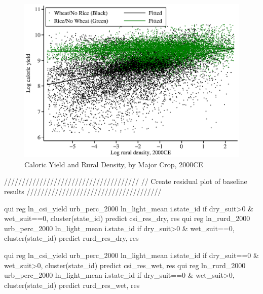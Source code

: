 \clearpage


\begin{figure}[!htb]
\begin{center}
\caption{Caloric Yield and Rural Density, by Major Crop, 2000CE}
\label{FIG_beta_crop}
\includegraphics[width=1.0\textwidth]{fig_beta_crop.eps}
\end{center}
\vspace{-.5cm}
\end{figure}


//////////////////////////////////////
// Create residual plot of baseline results
//////////////////////////////////////

qui reg ln_csi_yield urb_perc_2000 ln_light_mean i.state_id if dry_suit>0 & wet_suit==0, cluster(state_id)
predict csi_res_dry, res
qui reg ln_rurd_2000 urb_perc_2000 ln_light_mean i.state_id if dry_suit>0 & wet_suit==0, cluster(state_id)
predict rurd_res_dry, res

qui reg ln_csi_yield urb_perc_2000 ln_light_mean i.state_id if dry_suit==0 & wet_suit>0, cluster(state_id)
predict csi_res_wet, res
qui reg ln_rurd_2000 urb_perc_2000 ln_light_mean i.state_id if dry_suit==0 & wet_suit>0, cluster(state_id)
predict rurd_res_wet, res


